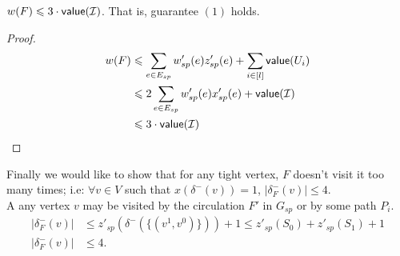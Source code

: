 \documentclass[./main.tex]{subfiles}
\begin{document}
		\begin{claim}
			$w(F) \leqslant 3\cdot\textsf{\textup{value}}(\mathcal{I})$. That is, guarantee $(1)$ holds.
		\end{claim}
		\begin{proof}
			\begin{align*}
				w(F) &\leqslant \sum_{e \in E_{sp}} w'_{sp}(e)z'_{sp}(e) + \sum_{i \in [l]} \textsf{\textup{value}}(U_i)\\
				 &\leqslant 2\sum_{e\in E_{sp}}w'_{sp}(e)x'_{sp}(e) + \textsf{\textup{value}}(\mathcal{I})\\
			 	&\leqslant 3\cdot\textsf{\textup{value}}(\mathcal{I})
			\end{align*}
		\end{proof}
		Finally we would like to show that for any tight vertex, $F$ doesn't visit it too many times; i.e: $\forall v \in V$ such that $x(\delta^-(v)) = 1$, $|\delta^-_F(v)| \leqslant 4$.\\
		A any vertex $v$ may be visited by the circulation $F'$ in $G_{sp}$ or by some path $P_i$.
		\begin{align*}
			|\delta^-_F(v)| &\leqslant z'_{sp}(\delta^-(\{(v^1, v^0)\})) + 1 \leqslant z'_{sp}(S_0) + z'_{sp}(S_1) + 1\\
			|\delta^-_F(v)| &\leqslant 4.
		\end{align*}
\end{document}
